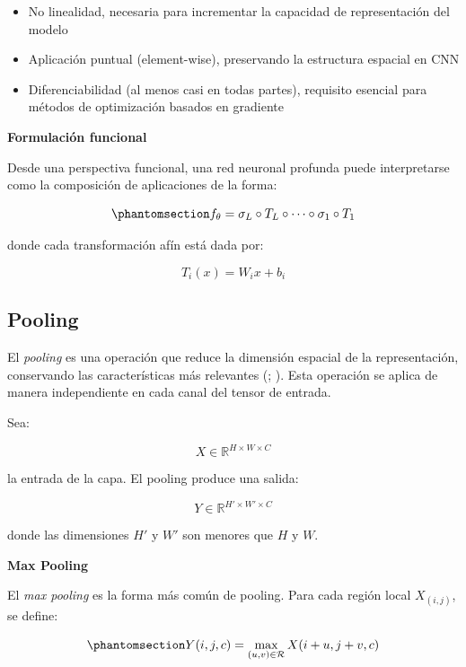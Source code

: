 \documentclass[
  spanish,
  us-letterpaper,
]{scrreprt}
\providecommand{\tightlist}{%
  \setlength{\itemsep}{0pt}\setlength{\parskip}{0pt}}
\theoremstyle{definition}
\theoremstyle{remark}
\begin{document}
\begin{itemize}
\tightlist
\item
  No linealidad, necesaria para incrementar la capacidad de
  representación del modelo
\item
  Aplicación puntual (element-wise), preservando la estructura espacial
  en CNN
\item
  Diferenciabilidad (al menos casi en todas partes), requisito esencial
  para métodos de optimización basados en gradiente
\end{itemize}

\textbf{Formulación funcional}

Desde una perspectiva funcional, una red neuronal profunda puede
interpretarse como la composición de aplicaciones de la forma:

\begin{equation}\phantomsection\label{eq-deep-functional}{
f_\theta = \sigma_L \circ T_L \circ \cdots \circ \sigma_1 \circ T_1
}\end{equation}

donde cada transformación afín está dada por:

\[
T_i(x) = W_i x + b_i
\]

\subsection{Pooling}\label{pooling}

El \emph{pooling} es una operación que reduce la dimensión espacial de
la representación, conservando las características más relevantes
(;
).
Esta operación se aplica de manera independiente en cada canal del
tensor de entrada.

Sea:

\[
X \in \mathbb{R}^{H \times W \times C}
\]

la entrada de la capa. El pooling produce una salida:

\[
Y \in \mathbb{R}^{H' \times W' \times C}
\]

donde las dimensiones \(H'\) y \(W'\) son menores que \(H\) y \(W\).

\textbf{Max Pooling}

El \emph{max pooling} es la forma más común de pooling. Para cada región
local \(X_{(i,j)}\), se define:

\begin{equation}\phantomsection\label{eq-maxpool}{
Y(i,j,c) = \max_{(u,v) \in \mathcal{R}} X(i+u, j+v, c)
}\end{equation}
\end{document}
